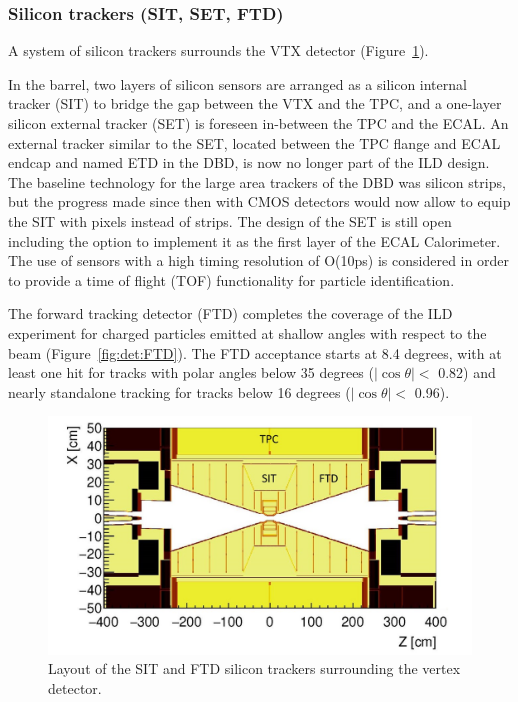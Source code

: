 \subsubsection{Silicon trackers (SIT, SET, FTD)}

A system of silicon trackers surrounds the VTX detector (Figure~\ref{fig:det:silicon}). 

In the barrel, two layers of silicon sensors are arranged as a silicon internal tracker (SIT) to bridge the gap between the VTX and the TPC, and a one-layer silicon external tracker (SET) is foreseen in-between the TPC and the ECAL. An external tracker similar to the SET, located between the TPC flange and ECAL endcap and named ETD in the DBD, is now no longer part of the ILD design. The baseline technology for the large area trackers of the DBD was silicon strips, but the progress made since then with CMOS detectors would now allow to equip the SIT with pixels instead of strips. The design of the SET is still open including the option to implement it as the first layer of the ECAL Calorimeter. The use of sensors with a high timing resolution of O(10ps) is considered in order to provide a time of flight (TOF) functionality  for particle identification. 

The forward tracking detector (FTD) completes the coverage of the ILD experiment for charged particles emitted at shallow angles with respect to the beam (Figure~\ref{fig:det:FTD}). The FTD acceptance starts at 8.4 degrees, with at least one hit for tracks with polar angles below 35 degrees ($|\cos \theta| < $ 0.82) and nearly standalone tracking for tracks below 16 degrees ($|\cos \theta| <$ 0.96).

\begin{figure}[t!]
\centering
\includegraphics[width=0.75\hsize]{Detector/fig/silicon_trackers.jpg}
\caption{Layout of the SIT and FTD silicon trackers surrounding the vertex detector.}
\label{fig:det:silicon}
\end{figure}

